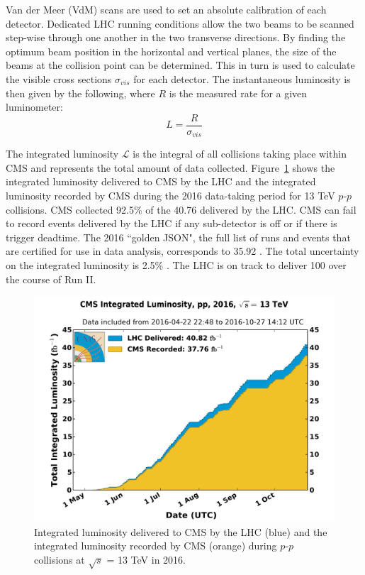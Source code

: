 Van der Meer (VdM) scans \cite{VanderMeer} are used to set an absolute calibration of each detector. Dedicated LHC running conditions allow the two beams to be scanned step-wise through one another in the two transverse directions. By finding the optimum beam position in the horizontal and vertical planes, the size of the beams at the collision point can be determined. This in turn is used to calculate the visible cross sections $\sigma_{vis}$ for each detector. The instantaneous luminosity is then given by the following, where $R$ is the measured rate for a given luminometer:
\begin{equation}
L = \frac{R}{\sigma_{vis}}
\end{equation}

The integrated luminosity $\mathcal{L}$ is the integral of all collisions taking place within CMS and represents the total amount of data collected. Figure~\ref{fig:lumi} shows the integrated luminosity delivered to CMS by the LHC and the integrated luminosity recorded by CMS during the 2016 data-taking period for 13 TeV $p$-$p$ collisions. CMS collected 92.5\% of the 40.76 \fbinv delivered by the LHC. CMS can fail to record events delivered by the LHC if any sub-detector is off or if there is trigger deadtime. The 2016 ``golden JSON", the full list of runs and events that are certified for use in data analysis, corresponds to 35.92 \fbinv. The total uncertainty on the integrated luminosity is 2.5\% \cite{lumiPAS}. The LHC is on track to deliver 100 \fbinv over the course of Run II. 

\begin{figure}[h!]
	\centering
	\includegraphics[width=\linewidth]{Figures/Detector/int_lumi_per_day_cumulative_pp_2016.pdf}
       \caption[Integrated luminosity delivered to and recorded by CMS during $p$-$p$ collisions at $\sqrt{s}$ = 13 TeV in 2016.]
       {Integrated luminosity delivered to CMS by the LHC (blue) and the integrated luminosity recorded by CMS (orange) during $p$-$p$ collisions at $\sqrt{s}$ = 13 TeV in 2016.}
         \label{fig:lumi}
\end{figure}






